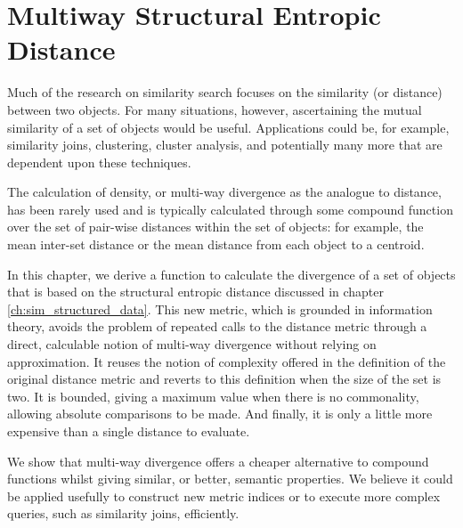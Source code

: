 \chapter{Multiway Structural Entropic Distance}\label{ch:multiway_structural_entropic_distance}
%
Much of the research on similarity search focuses on the similarity (or distance) between two objects.  For many situations, however, ascertaining the mutual similarity of a set of objects would be useful. Applications could be, for example, similarity joins, clustering, cluster analysis, and potentially many more that are dependent upon these techniques.

The calculation of density, or multi-way divergence as the analogue to distance, has been rarely used and is typically calculated through some compound function over the set of pair-wise distances within the set of objects: for example, the mean inter-set distance or the mean distance from each object to a centroid.  

In this chapter, we derive a function to calculate the divergence of a set of objects that is based on the structural entropic distance discussed in chapter \ref{ch:sim_structured_data}.  This new metric, which is grounded in information theory, avoids the problem of repeated calls to the distance metric through a direct, calculable notion of multi-way divergence without relying on approximation.  It reuses the notion of complexity offered in the definition of the original distance metric and reverts to this definition when the size of the set is two.  It is bounded, giving a maximum value when there is no commonality, allowing absolute comparisons to be made.  And finally, it is only a little more expensive than a single distance to evaluate.

We show that multi-way divergence offers a cheaper alternative to compound functions whilst giving similar, or better, semantic properties.  We believe it could be applied usefully to construct new metric indices or to execute more complex queries, such as similarity joins, efficiently. 

